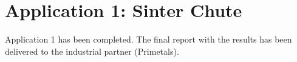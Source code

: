 
\section{Application 1: Sinter Chute}
\label{sec:application1sinterchute}

Application 1 has been completed. The final report with the results has been
delivered to the industrial partner (Primetals).



